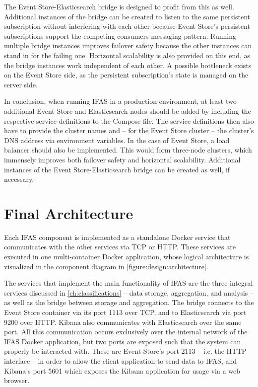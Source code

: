 The Event Store-Elasticsearch bridge is designed to profit from this as well.
Additional instances of the bridge can be created to listen to the same persistent subscription without interfering with each other because Event Store's persistent subscriptions support the competing consumers messaging pattern.
Running multiple bridge instances improves failover safety because the other instances can stand in for the failing one.
Horizontal scalability is also provided on this end, as the bridge instances work independent of each other.
A possible bottleneck exists on the Event Store side, as the persistent subscription's state is managed on the server side.

In conclusion, when running \ac{IFAS} in a production environment, at least two additional Event Store and Elasticsearch nodes should be added by including the respective service definitions to the Compose file.
The service definitions then also have to provide the cluster names and -- for the Event Store cluster -- the cluster's DNS address via environment variables.
In the case of Event Store, a load balancer should also be implemented.
This would form three-node clusters, which immensely improves both failover safety and horizontal scalability.
Additional instances of the Event Store-Elasticsearch bridge can be created as well, if necessary.


\section{Final Architecture}
\label{section:design:architecture}

Each \ac{IFAS} component is implemented as a standalone Docker service that communicates with the other services via \ac{TCP} or \ac{HTTP}.
These services are executed in one multi-container Docker application, whose logical architecture is visualized in the component diagram in \cref{figure:design:architecture}.

The services that implement the main functionality of \ac{IFAS} are the three integral services discussed in \cref{ch:classifications} -- data storage, aggregation, and analysis -- as well as the bridge between storage and aggregation.
The bridge connects to the Event Store container via its port 1113 over \ac{TCP}, and to Elasticsearch via port 9200 over \ac{HTTP}.
Kibana also communicates with Elasticsearch over the same port.
All this communication occurs exclusively over the internal network of the \ac{IFAS} Docker application, but two ports are exposed such that the system can properly be interacted with.
These are Event Store's port 2113 -- i.e. the \ac{HTTP} interface -- in order to allow the client application to send data to \ac{IFAS}, and Kibana's port 5601 which exposes the Kibana application for usage via a web browser.


